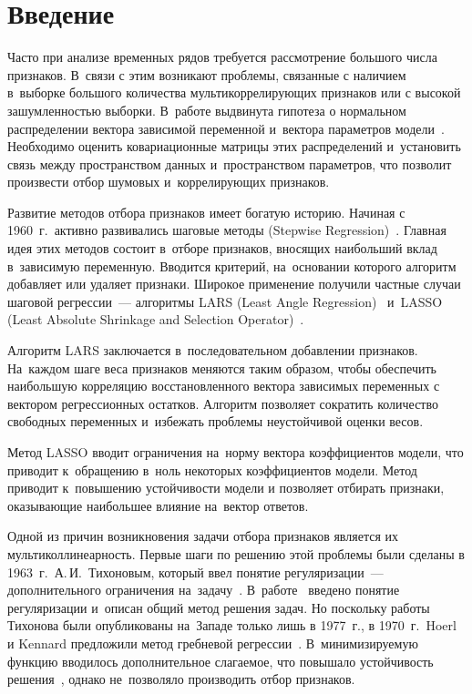       \begin{multicols}{2}

            \label{st\stat}




\section{Введение}

Часто при анализе временных рядов требуется рассмотрение большого
числа признаков.  В~связи с этим возникают проблемы, связанные с
наличием в~выборке большого количества мультикоррелирующих признаков
или с высокой зашумленностью выборки. В~работе выдвинута  гипотеза о
нормальном распределении вектора зависимой переменной и~вектора
параметров модели~\cite{strijov1, weber}. Необходимо оценить
ковариационные матрицы этих распределений и~установить связь между
пространством данных и~пространством параметров, что позволит
произвести отбор шумовых и~коррелирующих признаков.

Развитие методов отбора признаков имеет богатую историю. Начиная с
1960~г.\ активно развивались шаговые методы (Stepwise
Regression)~\cite{stepwise}. Главная идея этих методов состоит
в~отборе признаков, вносящих наибольший вклад в~зависимую
переменную. Вводится критерий, на~основании которого алгоритм
добавляет или удаляет признаки. Широкое применение получили частные
случаи шаговой регрессии~--- алгоритмы  LARS (Least Angle
Regression)~\cite{lars} и~LASSO (Least Absolute Shrinkage and
Selection Operator)~\cite{lasso}. 

Алгоритм LARS заключается
в~последовательном добавлении признаков. На~каж\-дом шаге веса
признаков меняются таким образом, чтобы обеспечить наибольшую
корреляцию восстановленного вектора зависимых переменных с вектором
регрессионных остатков. Алгоритм позволяет сократить количество
свободных переменных и~избежать проб\-ле\-мы неустойчивой оценки весов.

Метод LASSO вводит ограничения на~норму вектора коэффициентов
модели, что приводит к~обращению в~ноль некоторых коэффициентов
модели. Метод приводит к~повышению устойчивости модели и позволяет
отбирать признаки, ока\-зы\-ва\-ющие наибольшее влияние на~вектор ответов.

Одной из причин возникновения задачи отбора признаков является их
мультиколлинеарность. Первые шаги по решению этой проблемы были
сделаны в 1963~г.\ А.\,И.~Тихоновым, который ввел понятие
регуляризации~--- дополнительного ограничения
на~задачу~\cite{regular}. В~работе~\cite{ridzh1} введено понятие
регуляризации и~описан общий метод решения задач. Но поскольку
работы Тихонова были опуб\-ли\-ко\-ва\-ны на~Западе только лишь в
1977~г., в 1970~г.\ Hoerl и Kennard предложили метод
гребневой регрессии~\cite{ridzh2}. В~минимизируемую функцию
вводилось дополнительное слагаемое, что повышало устойчивость
решения~\cite{ridzh3}, однако не~позволяло производить отбор
признаков. 


\end{multicols}
